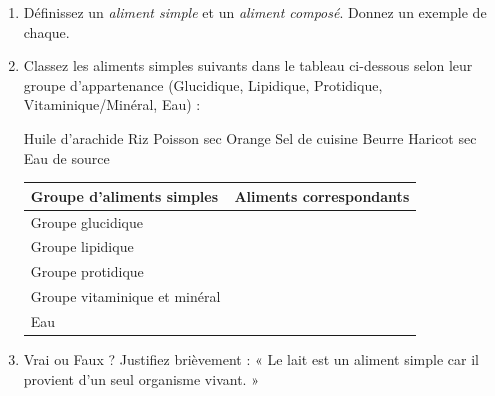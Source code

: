 \documentclass[11pt]{article}
\begin{document}
\begin{exercice}
\begin{enumerate}
    \item Définissez un \textit{aliment simple} et un \textit{aliment composé}. Donnez un exemple de chaque.
    \item Classez les aliments simples suivants dans le tableau ci-dessous selon leur groupe d'appartenance (Glucidique, Lipidique, Protidique, Vitaminique/Minéral, Eau) :
    \begin{center}
    Huile d'arachide \quad Riz \quad Poisson sec \quad Orange \quad Sel de cuisine \quad Beurre \quad Haricot sec \quad Eau de source
    \end{center}
    \begin{tabular}{|l|l|}
    \hline
    \textbf{Groupe d'aliments simples} & \textbf{Aliments correspondants} \\
    \hline
    Groupe glucidique & \\
    \hline
    Groupe lipidique & \\
    \hline
    Groupe protidique & \\
    \hline
    Groupe vitaminique et minéral & \\
    \hline
    Eau & \\
    \hline
    \end{tabular}
    \item Vrai ou Faux ? Justifiez brièvement : « Le lait est un aliment simple car il provient d'un seul organisme vivant. »
\end{enumerate}
\end{exercice}
\end{document}
